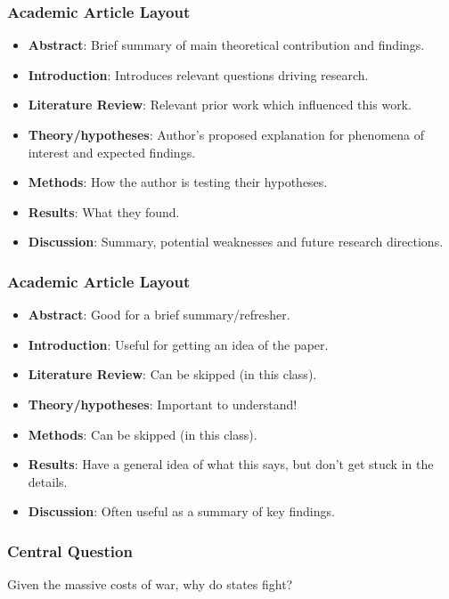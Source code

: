 \documentclass[handout]{beamer}
\begin{document}
\begin{frame} 
	\frametitle{\LARGE{Academic Article Layout}}
	\begin{itemize}
		\item \textbf{Abstract}: Brief summary of main theoretical contribution and findings. \pause
		\item \textbf{Introduction}: Introduces relevant questions driving research. \pause
		\item \textbf{Literature Review}: Relevant prior work which influenced this work. \pause
		\item \textbf{Theory/hypotheses}: Author's proposed explanation for phenomena of interest and expected findings. \pause
		\item \textbf{Methods}: How the author is testing their hypotheses. \pause
		\item \textbf{Results}: What they found. \pause
		\item \textbf{Discussion}: Summary, potential weaknesses and future research directions. 
	\end{itemize}
\end{frame}

\begin{frame} 
	\frametitle{\LARGE{Academic Article Layout}}
	\begin{itemize}
		\item \textbf{Abstract}: Good for a brief summary/refresher. \pause
		\item \textbf{Introduction}: Useful for getting an idea of the paper. \pause
		\item \textbf{Literature Review}: Can be skipped (in this class). \pause
		\item \textbf{Theory/hypotheses}: Important to understand! \pause
		\item \textbf{Methods}: Can be skipped (in this class). \pause
		\item \textbf{Results}: Have a general idea of what this says, but don't get stuck in the details. \pause
		\item \textbf{Discussion}: Often useful as a summary of key findings. 
	\end{itemize}
\end{frame}

\begin{frame} 
	\frametitle{\LARGE{Central Question}}
	\begin{center}
		\LARGE Given the massive costs of war, why do states fight? 
	\end{center}
\end{frame}
\end{document}
